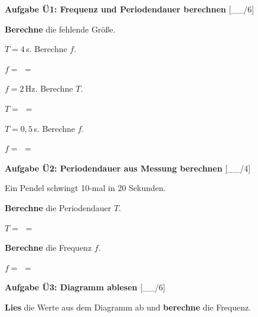 \documentclass[11pt, a4paper]{article}
\newcommand{\luecke}[1]{\underline{\hspace{#1}}}
\newcommand{\punktebox}[1]{\hfill\small\textcolor{mittelgrau}{[\_\_/#1]}}
\newcommand{\aufgabe}[1]{%
    \needspace{4\baselineskip}%
    \vspace{10pt}%
    \noindent\textbf{\textcolor{fachfarbe}{Aufgabe #1}}%
    \vspace{4pt}%
    \nopagebreak[4]%
}
\newcommand{\operator}[1]{\textbf{\textcolor{fachfarbe}{#1}}}
\begin{document}

\aufgabe{Ü1: Frequenz und Periodendauer berechnen} \punktebox{6}

\operator{Berechne} die fehlende Größe.

\begin{teil}
    \item $T = 4\,$s. Berechne $f$.

    \vspace{0.3em}
    $f = $ \luecke{6cm} $= $ \luecke{2cm}
    \vspace{0.5em}

    \item $f = 2\,$Hz. Berechne $T$.

    \vspace{0.3em}
    $T = $ \luecke{6cm} $= $ \luecke{2cm}
    \vspace{0.5em}

    \item $T = 0{,}5\,$s. Berechne $f$.

    \vspace{0.3em}
    $f = $ \luecke{6cm} $= $ \luecke{2cm}
\end{teil}


\aufgabe{Ü2: Periodendauer aus Messung berechnen} \punktebox{4}

Ein Pendel schwingt 10-mal in 20 Sekunden.

\begin{teil}
    \item \operator{Berechne} die Periodendauer $T$.

    \vspace{0.3em}
    $T = $ \luecke{6cm} $= $ \luecke{2cm}

    \item \operator{Berechne} die Frequenz $f$.

    \vspace{0.3em}
    $f = $ \luecke{6cm} $= $ \luecke{2cm}
\end{teil}


\aufgabe{Ü3: Diagramm ablesen} \punktebox{6}

\operator{Lies} die Werte aus dem Diagramm ab und \operator{berechne} die Frequenz.
\end{document}
